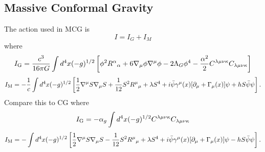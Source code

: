 \documentclass[10pt,letterpaper]{article}
\numberwithin{equation}{subsection}
\begin{document}
\subsection{Massive Conformal Gravity}
The action used in MCG is 
\begin{equation}
I = I_G+I_M
\end{equation}
where
\begin{equation}
I_{\rm G} = \frac{c^3}{16\pi G} \int d^4x(-g)^{1/2} \left[ \phi^2 R^{\alpha}{}_\alpha + 6 \nabla_\mu \phi \nabla^\mu \phi - 2\Lambda_G \phi^4 - \frac{\alpha^2}{2}C^{\lambda\mu\nu\kappa}C_{\lambda\mu\nu\kappa}\right]
\end{equation}
\begin{equation}
I_{\rm M} = -\frac{1}{c}\int d^4x (-g)^{1/2} \left[ \frac12 \nabla^\mu S \nabla_\mu S + \frac{1}{12} S^2 R^{\mu}{}_{\mu} + \lambda S^4 
+ i\bar\psi\gamma^\mu(x)[\partial_\mu + \Gamma_\mu(x)]\psi +hS\bar\psi\psi\right].
\end{equation}
Compare this to CG where
\begin{equation}
I_{\rm G} = -\alpha_g \int d^4x (-g)^{1/2} C^{\lambda\mu\nu\kappa}C_{\lambda\mu\nu\kappa}
\end{equation}
\begin{equation}
	I_{\rm M} = -\int d^4x(-g)^{1/2} \left[ \frac12 \nabla^\mu S \nabla_\mu S - \frac{1}{12} S^2 R^{\mu}{}_{\mu} + \lambda S^4 
+ i\bar\psi\gamma^\mu(x)[\partial_\mu + \Gamma_\mu(x)]\psi -hS\bar\psi\psi\right].
\end{equation}
\end{document}
